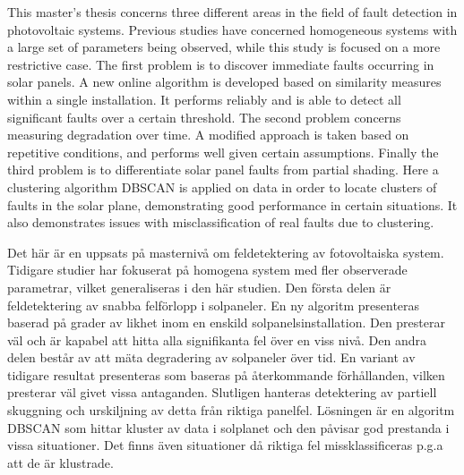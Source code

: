 \newenvironment{abstractpage}
  {\cleardoublepage\vspace*{\fill}\thispagestyle{empty}}
  {\vfill\cleardoublepage}
\newenvironment{polyAbstract}[1]
  {\bigskip\selectlanguage{#1}%
   \begin{center}\bfseries\abstractname\end{center}}
  {\par\bigskip}

\begin{abstractpage}
\begin{polyAbstract}{english}
This master's thesis concerns three different areas in the field of fault detection in photovoltaic systems.
Previous studies have concerned homogeneous systems with a large set of parameters being observed, while this study is focused on a more restrictive case.
The first problem is to discover immediate faults occurring in solar panels.
A new online algorithm is developed based on similarity measures within a single installation.
It performs reliably and is able to detect all significant faults over a certain threshold.
The second problem concerns measuring degradation over time.
A modified approach is taken based on repetitive conditions, and performs well given certain assumptions.
Finally the third problem is to differentiate solar panel faults from partial shading.
Here a clustering algorithm DBSCAN is applied on data in order to locate clusters of faults in the solar plane, demonstrating good performance in certain situations.
It also demonstrates issues with misclassification of real faults due to clustering.

\end{polyAbstract}

\begin{polyAbstract}{swedish}
Det här är en uppsats på masternivå om feldetektering av fotovoltaiska system.
Tidigare studier har fokuserat på homogena system med fler observerade parametrar, vilket generaliseras i den här studien.
Den första delen är feldetektering av snabba felförlopp i solpaneler.
En ny algoritm presenteras baserad på grader av likhet inom en enskild solpanelsinstallation.
Den presterar väl och är kapabel att hitta alla signifikanta fel över en viss nivå.
Den andra delen består av att mäta degradering av solpaneler över tid.
En variant av tidigare resultat presenteras som baseras på återkommande förhållanden, vilken presterar väl givet vissa antaganden.
Slutligen hanteras detektering av partiell skuggning och urskiljning av detta från riktiga panelfel.
Lösningen är en algoritm DBSCAN som hittar kluster av data i solplanet och den påvisar god prestanda i vissa situationer.
Det finns även situationer då riktiga fel missklassificeras p.g.a att de är klustrade.

\end{polyAbstract}
\end{abstractpage}

